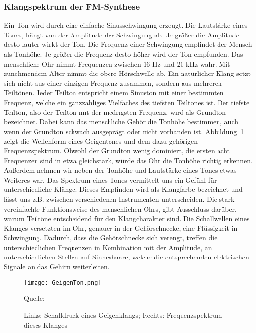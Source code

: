 \subsubsection{Klangspektrum der FM-Synthese}
\label{bulli:ohrToeneUndFrequenzen}
Ein Ton wird durch eine einfache Sinusschwingung erzeugt. Die Lautstärke eines Tones, hängt von der Amplitude der Schwingung ab. Je größer die Amplitude desto lauter wirkt der Ton. Die Frequenz einer Schwingung empfindet der Mensch als Tonhöhe. Je größer die Frequenz desto höher wird der Ton empfunden. 
Das menschliche Ohr nimmt Frequenzen zwischen 16 Hz und 20 kHz wahr. Mit zunehmendem Alter nimmt die obere Hörschwelle ab. \cite[S. 199]{borucki}
Ein natürlicher Klang setzt sich nicht aus einer einzigen Frequenz zusammen, sondern aus mehreren Teiltönen. Jeder Teilton entspricht einem Sinuston mit einer bestimmten Frequenz, welche ein ganzzahliges Vielfaches des tiefsten Teiltones ist. Der tiefste Teilton, also der Teilton mit der niedrigsten Frequenz, wird als Grundton bezeichnet. \cite[S. 87]{borucki} 
Dabei kann das menschliche Gehör die Tonhöhe bestimmen, auch wenn der Grundton schwach ausgeprägt oder nicht vorhanden ist. \cite[S. 4]{zwicker} Abbildung~\ref{fig:geige} zeigt die Wellenform eines Geigentones und dem dazu gehörigen Frequenzspektrum.
Obwohl der Grundton wenig dominiert, die ersten acht Frequenzen sind in etwa gleichstark, würde das Ohr die Tonhöhe richtig erkennen.
Außerdem nehmen wir neben der Tonhöhe und Lautstärke eines Tones etwas Weiteres war. Das Spektrum eines Tones vermittelt uns ein Gefühl für unterschiedliche Klänge. Dieses Empfinden wird als Klangfarbe bezeichnet und lässt uns z.B. zwischen verschiedenen Instrumenten unterscheiden. \cite[S. 5]{zwicker} \cite[S. 226]{raichel}
Die stark vereinfachte Funktionsweise des menschlichen Ohrs, gibt Ausschluss darüber, warum Teiltöne entscheidend für den Klangcharakter sind. Die Schallwellen eines Klanges versetzten im Ohr, genauer in der Gehörschnecke, eine Flüssigkeit in Schwingung. Dadurch, dass die Gehörschnecke sich verengt, treffen die unterschiedlichen Frequenzen in Kombination mit der Amplitude, an unterschiedlichen Stellen auf Sinneshaare, welche die entsprechenden elektrischen Signale an das Gehirn weiterleiten. \cite[S. 87 f.]{zwicker}

\begin{figure} [ht]
\centering
  \texttt{[image: GeigenTon.png]}
\caption{Links: Schalldruck eines Geigenklangs; Rechts: Frequenzspektrum dieses Klanges}
\label{fig:geige}
Quelle: \cite[S. 4]{zwicker}
\end{figure}
\FloatBarrier

